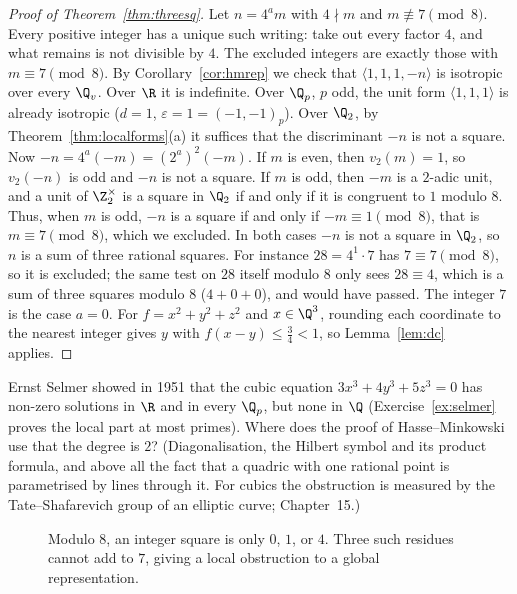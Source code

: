 \begin{proof}[Proof of Theorem~\ref{thm:threesq}]
Let $n=4^am$ with $4\nmid m$ and $m\not\equiv7\pmod8$. Every positive integer has a unique such writing: take out every factor $4$, and what remains is not divisible by $4$. The excluded integers are exactly those with $m\equiv7\pmod8$. By Corollary~\ref{cor:hmrep} we check that
$\langle1,1,1,-n\rangle$ is isotropic over every $\Q_v$. Over $\R$ it is indefinite. Over $\Q_p$, $p$ odd, the unit form
$\langle1,1,1\rangle$ is already isotropic ($d=1$, $\varepsilon=1=(-1,-1)_p$). Over $\Q_2$, by Theorem~\ref{thm:localforms}(a) it
suffices that the discriminant $-n$ is not a square. Now $-n=4^a(-m)=(2^a)^2(-m)$. If $m$ is even, then $v_2(m)=1$, so $v_2(-n)$ is odd and $-n$ is not a square. If $m$ is odd, then $-m$ is a $2$-adic unit, and a unit of $\Z_2^\times$ is a square in $\Q_2$ if and only if it is congruent to $1$ modulo $8$. Thus, when $m$ is odd, $-n$ is a square if and only if $-m\equiv1\pmod8$, that is $m\equiv7\pmod8$, which we excluded. In both cases $-n$ is not a square in $\Q_2$, so $n$ is a sum of three rational squares. For instance $28=4^1\cdot7$ has $7\equiv7\pmod8$, so it is excluded; the same test on $28$ itself modulo $8$ only sees $28\equiv4$, which is a sum of three squares modulo $8$ ($4+0+0$), and would have passed. The integer $7$ is the case $a=0$. For $f=x^2+y^2+z^2$ and $x\in\Q^3$, rounding each
coordinate to the nearest integer gives $y$ with $f(x-y)\le\frac34<1$, so Lemma~\ref{lem:dc} applies.
\end{proof}

\begin{think}
Ernst Selmer showed in 1951 that the cubic equation $3x^3+4y^3+5z^3=0$ has non-zero solutions in $\R$ and in every $\Q_p$, but
none in $\Q$ (Exercise~\ref{ex:selmer} proves the local part at most primes). Where does the proof of Hasse--Minkowski use that the
degree is $2$? (Diagonalisation, the Hilbert symbol and its product formula, and above all the fact that a quadric with one
rational point is parametrised by lines through it. For cubics the obstruction is measured by the Tate--Shafarevich group of an
elliptic curve; Chapter~15.)
\end{think}

\begin{figure}[ht]
\centering
{}
\caption{Modulo $8$, an integer square is only $0$, $1$, or $4$. Three such residues cannot add to $7$, giving a local obstruction to a global representation.}
\label{fig:v13-extra-10-a}
\end{figure}

